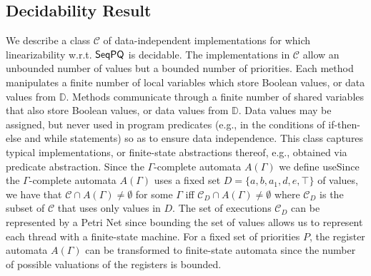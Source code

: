 %



\subsection{Decidability Result}
\label{subsec:combine step-by-step linearizability and co-regular}

We describe a class $\mathcal{C}$ of data-independent implementations for which linearizability w.r.t. $\mathsf{SeqPQ}$ is decidable. The implementations in $\mathcal{C}$ allow an unbounded number of values but a bounded number of priorities. Each method manipulates a finite number of local variables which store Boolean values, or data values from $\mathbb{D}$. Methods communicate through a finite number of shared variables that also store Boolean values, or data values from $\mathbb{D}$. Data values may be assigned, but never used in program predicates (e.g., in the conditions of if-then-else and while statements) so as to ensure data independence. This class captures typical implementations, or finite-state abstractions thereof, e.g., obtained via predicate abstraction. {\color{blue}Since the $\Gamma$-complete automata $A(\Gamma)$ we define use}{\color {red}Since the $\Gamma$-complete automata $A(\Gamma)$ uses} a fixed set {\color {red}$D=\{a,b,a_1,d,e,\top\}$ of values}, we have that {\color {red}$\mathcal{C}\cap A(\Gamma)\neq\emptyset$ for some $\Gamma$ iff $\mathcal{C}_D\cap A(\Gamma)\neq\emptyset$ where $\mathcal{C}_D$ is the subset of $\mathcal{C}$ that uses only values in $D$.} {\color{blue}The set of executions $\mathcal{C}_D$ can be represented by a Petri Net since bounding the set of values allows us to represent each thread with a finite-state machine. For a fixed set of priorities $P$, the register automata $A(\Gamma)$ can be transformed to finite-state automata since the number of possible valuations of the registers is bounded.}


